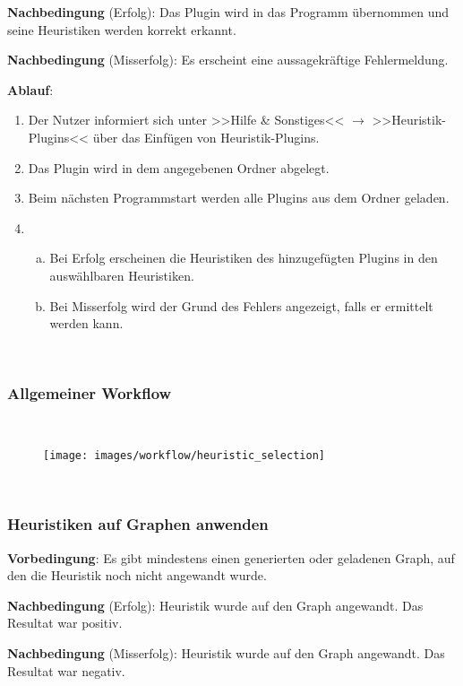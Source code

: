 \documentclass{article}
\begin{document}
	\textbf{Nachbedingung} (Erfolg): Das Plugin wird in das Programm übernommen und seine Heuristiken werden korrekt erkannt.
	
	\textbf{Nachbedingung} (Misserfolg): Es erscheint eine aussagekräftige Fehlermeldung.
	
	\textbf{Ablauf}:
	\begin{enumerate}[1)]
		\item{Der Nutzer informiert sich unter >>Hilfe \& Sonstiges<< $\rightarrow$ >>Heuristik-Plugins<< über das Einfügen von Heuristik-Plugins.}
		\item{Das Plugin wird in dem angegebenen Ordner abgelegt.}
		\item{Beim nächsten Programmstart werden alle Plugins aus dem Ordner geladen.}
		\item{
			\begin{enumerate}[a)]
				\item{Bei Erfolg erscheinen die Heuristiken des hinzugefügten Plugins in den auswählbaren Heuristiken.}
				\item{Bei Misserfolg wird der Grund des Fehlers angezeigt, falls er ermittelt werden kann.}
			\end{enumerate}
		}
	\end{enumerate}
	
	~\newpage
	\subsubsection{Allgemeiner Workflow}
	~\begin{figure}[!h]
		\centering
		\texttt{[image: images/workflow/heuristic\_selection]}
	\end{figure}
	
	\FloatBarrier
	
	~\newpage
	\subsubsection{Heuristiken auf Graphen anwenden}
	\textbf{Vorbedingung}: Es gibt mindestens einen generierten oder geladenen Graph, auf den die Heuristik noch nicht angewandt wurde.
	
	\textbf{Nachbedingung} (Erfolg): Heuristik wurde auf den Graph angewandt. Das Resultat war positiv.
	
	\textbf{Nachbedingung} (Misserfolg): Heuristik wurde auf den Graph angewandt. Das Resultat war negativ.
	
\end{document}
